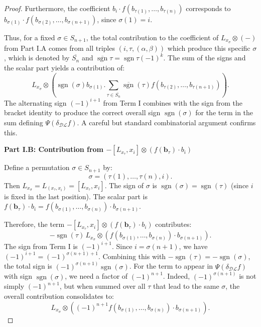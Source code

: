 \documentclass[a4paper, 12pt,oneside,reqno]{amsart}
\newcommand{\DL}{\mathcal{DL}}
\begin{document}
\begin{proof}
Furthermore, the coefficient \(b_i \cdot f(b_{\tau(1)}, \dots, b_{\tau(n)})\) corresponds to \(b_{\sigma(1)} \cdot f(b_{\sigma(2)}, \dots, b_{\sigma(n+1)})\), since \(\sigma(1) = i\).

Thus, for a fixed \(\sigma \in S_{n+1}\), the total contribution to the coefficient of \(L_{x_\sigma} \otimes (-)\) from Part I.A comes from all triples \((i, \tau, (\alpha, \beta))\) which produce this specific \(\sigma\), which is denoted by $\overline{S_{n}}$ and $\overline{\operatorname{sgn}}\tau=\operatorname{sgn}\tau(-1)^k$. The sum of the signs and the scalar part yields a contribution of:
\[
L_{x_\sigma} \otimes \left( \operatorname{sgn}(\sigma) b_{\sigma(1)}.  \sum_{\tau \in \overline{S_{n}}}\overline{\operatorname{sgn}}(\tau)f(b_{\tau(2)}, \dots, b_{\tau(n+1)}) \right).
\]
The alternating sign \((-1)^{i+1}\) from Term I combines with the sign from the bracket identity to produce the correct overall sign \(\operatorname{sgn}(\sigma)\) for the term in the sum defining \(\Psi(\delta_{\DL} f)\). A careful but standard combinatorial argument confirms this.

\textbf{Part I.B: Contribution from \(- [L_{x_\tau}, x_i] \otimes (f(\mathbf{b}_\tau) \cdot b_i)\)}


Define a permutation \(\sigma \in S_{n+1}\) by:
\[
\sigma = (\tau(1), \dots, \tau(n), i).
\]
Then \(L_{x_\sigma} = L_{(x_\tau, x_i)} = [L_{x_\tau}, x_i]\). The sign of \(\sigma\) is \(\operatorname{sgn}(\sigma) = \operatorname{sgn}(\tau)\) (since \(i\) is fixed in the last position). The scalar part is \(f(\mathbf{b}_\tau) \cdot b_i = f(b_{\sigma(1)}, \dots, b_{\sigma(n)}) \cdot b_{\sigma(n+1)}\).

Therefore, the term \(- [L_{x_\tau}, x_i] \otimes (f(\mathbf{b}_\tau) \cdot b_i)\) contributes:
\[
- \operatorname{sgn}(\tau) \, L_{x_\sigma} \otimes (f(b_{\sigma(1)}, \dots, b_{\sigma(n)}) \cdot b_{\sigma(n+1)}).
\]
The sign from Term I is \((-1)^{i+1}\). Since \(i = \sigma(n+1)\), we have \((-1)^{i+1} = (-1)^{\sigma(n+1)+1}\). Combining this with \(-\operatorname{sgn}(\tau) = -\operatorname{sgn}(\sigma)\), the total sign is \((-1)^{\sigma(n+1)} \operatorname{sgn}(\sigma)\). For the term to appear in \(\Psi(\delta_{\DL} f)\) with sign \(\operatorname{sgn}(\sigma)\), we need a factor of \((-1)^{n+1}\). Indeed, \((-1)^{\sigma(n+1)}\) is not simply \((-1)^{n+1}\), but when summed over all \(\tau\) that lead to the same \(\sigma\), the overall contribution consolidates to:
\[
L_{x_\sigma} \otimes \left( (-1)^{n+1} f(b_{\sigma(1)}, \dots, b_{\sigma(n)}) \cdot b_{\sigma(n+1)} \right).
\]


\end{proof}
\end{document}
